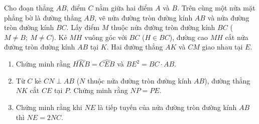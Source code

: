 \begin{ex}%
	Cho đoạn thẳng $AB$, điểm $C$ nằm giữa hai điểm $A$ và $B$. Trên cùng một nửa mặt phẳng bờ là đường thẳng $AB$, vẽ nửa đường tròn đường kính $AB$ và nửa đường tròn đường kính $BC$. Lấy điểm $M$ thuộc nửa đường tròn đường kính $BC$ ($M\ne B;\ M\ne C$). Kẻ $MH$ vuông góc với $BC$ ($H\in BC$), đường cao $MH$ cắt nửa đường tròn đường kính $AB$ tại $K$. Hai đường thẳng $AK$ và $CM$ giao nhau tại $E$.
	\begin{enumerate}
		\item Chứng minh rằng $\widehat{HKB}=\widehat{CEB}$ và $BE^2=BC\cdot AB$.
		\item Từ $C$ kẻ $CN\perp AB$ ($N$ thuộc nửa đường tròn đường kính $AB$), đường thẳng $NK$ cắt $CE$ tại $P$. Chứng minh rằng $NP=PE$.
		\item Chứng minh rằng khi $NE$ là tiếp tuyến của nửa đường tròn đường kính $AB$ thì $NE=2NC$.
	\end{enumerate}
\end{ex}
